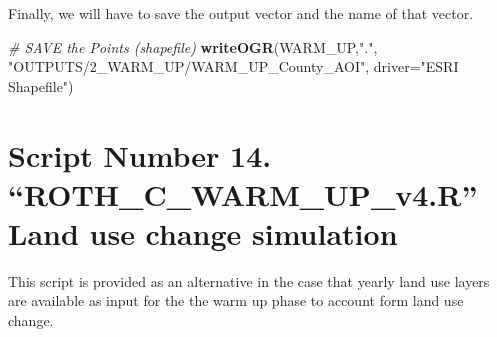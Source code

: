\documentclass[
  10pt,
  b5paper,
]{book}
\newenvironment{Shaded}{\begin{snugshade}}{\end{snugshade}}
\newcommand{\CommentTok}[1]{\textcolor[rgb]{0.56,0.35,0.01}{\textit{#1}}}
\newcommand{\DataTypeTok}[1]{\textcolor[rgb]{0.13,0.29,0.53}{#1}}
\newcommand{\KeywordTok}[1]{\textcolor[rgb]{0.13,0.29,0.53}{\textbf{#1}}}
\newcommand{\NormalTok}[1]{#1}
\newcommand{\StringTok}[1]{\textcolor[rgb]{0.31,0.60,0.02}{#1}}
\begin{document}
Finally, we will have to save the output vector and the name of that vector.

\begin{Shaded}
\begin{Highlighting}[]
 \CommentTok{# SAVE the Points (shapefile) }
\KeywordTok{writeOGR}\NormalTok{(WARM_UP,}\StringTok{"."}\NormalTok{, }\StringTok{"OUTPUTS/2_WARM_UP/WARM_UP_County_AOI"}\NormalTok{, }\DataTypeTok{driver=}\StringTok{"ESRI Shapefile"}\NormalTok{)}
\end{Highlighting}
\end{Shaded}

\hypertarget{script-number-14.-roth_c_warm_up_v4.r-land-use-change-simulation}{%
\section{Script Number 14. ``ROTH\_C\_WARM\_UP\_v4.R'' Land use change simulation}\label{script-number-14.-roth_c_warm_up_v4.r-land-use-change-simulation}}

This script is provided as an alternative in the case that yearly land use layers are available as input for the the warm up phase to account form land use change.
\end{document}
